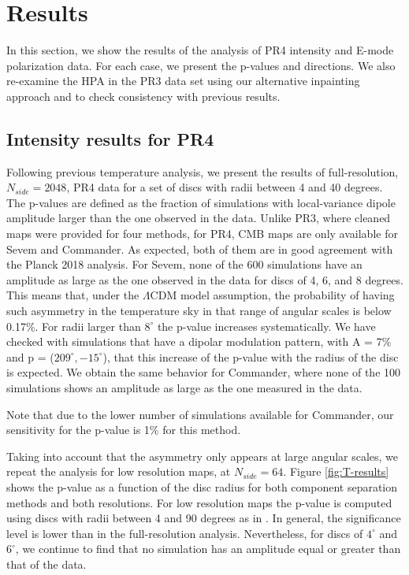 \section{Results} \label{Res}

In this section, we show the results of the analysis of PR4 intensity and E-mode polarization data. For each case, we present the p-values and directions. We also re-examine the HPA in the PR3 data set using our alternative inpainting approach and to check consistency with previous results.

\subsection{Intensity results for PR4}

Following previous temperature analysis, we present the results of full-resolution, $N_{side} = 2048$, PR4 data for a set of discs with radii between 4 and 40 degrees. The p-values are defined as the fraction of simulations with local-variance dipole amplitude larger than the one observed in the data. Unlike PR3, where cleaned maps were provided for four methods, for PR4, CMB maps are only available for Sevem and Commander. As expected, both of them are in good agreement with the Planck 2018 analysis. For Sevem, none of the 600 simulations have an amplitude as large as the one observed in the data for discs of 4, 6, and 8 degrees. This means that, under the $\Lambda$CDM model assumption, the probability of having such asymmetry in the temperature sky in that range of angular scales is below 0.17\%. For radii larger than $8^{\circ}$ the p-value increases systematically. We have checked with simulations that have a dipolar modulation pattern, with A = 7\% and p = ($209^{\circ}, -15^{\circ}$), that this increase of the p-value with the radius of the disc is expected. We obtain the same behavior for Commander, where none of the 100 simulations shows an amplitude as large as the one measured in the data. {Note that due to the lower number of simulations available for Commander, our sensitivity for the p-value is 1\% for this method.

Taking into account that the asymmetry only appears at large angular scales, we repeat the analysis for low resolution maps, at $N_{side} = 64$. Figure \ref{fig:T-results} shows the p-value as a function of the disc radius for both component separation methods and both resolutions. For low resolution maps the p-value is computed using discs with radii between 4 and 90 degrees as in \cite{Planck:2019evm}. In general, the significance level is lower than in the full-resolution analysis. Nevertheless, for discs of $4^{\circ}$ and $6^{\circ}$, we continue to find that no simulation has an amplitude equal or greater than that of the data.

}
